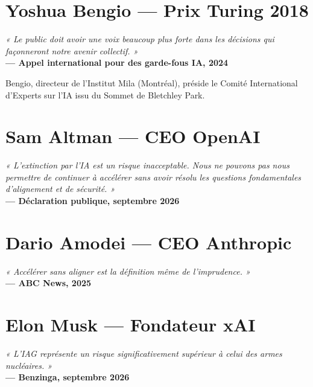 \documentclass[11pt,a4paper,openany]{book}
\begin{document}
\section{Yoshua Bengio — Prix Turing 2018}

\begin{quoteauthor}
\textit{« Le public doit avoir une voix beaucoup plus forte dans les décisions qui façonneront notre avenir collectif. »}\\[4pt]
\textbf{— Appel international pour des garde-fous IA, 2024}
\end{quoteauthor}

Bengio, directeur de l'Institut Mila (Montréal), préside le Comité International d'Experts sur l'IA issu du Sommet de Bletchley Park.

\section{Sam Altman — CEO OpenAI}

\begin{quoteauthor}
\textit{« L'extinction par l'IA est un risque inacceptable. Nous ne pouvons pas nous permettre de continuer à accélérer sans avoir résolu les questions fondamentales d'alignement et de sécurité. »}\\[4pt]
\textbf{— Déclaration publique, septembre 2026}
\end{quoteauthor}

\section{Dario Amodei — CEO Anthropic}

\begin{quoteauthor}
\textit{« Accélérer sans aligner est la définition même de l'imprudence. »}\\[4pt]
\textbf{— ABC News, 2025}
\end{quoteauthor}

\section{Elon Musk — Fondateur xAI}

\begin{quoteauthor}
\textit{« L'IAG représente un risque significativement supérieur à celui des armes nucléaires. »}\\[4pt]
\textbf{— Benzinga, septembre 2026}
\end{quoteauthor}
\end{document}
